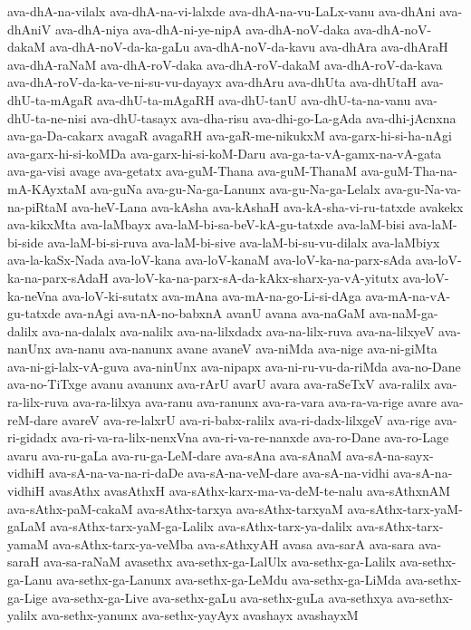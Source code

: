 {ava-dhA-na-vilalx
ava-dhA-na-vi-lalxde
ava-dhA-na-vu-LaLx-vanu
ava-dhAni
ava-dhAniV
ava-dhA-niya
ava-dhA-ni-ye-nipA
ava-dhA-noV-daka
ava-dhA-noV-dakaM
ava-dhA-noV-da-ka-gaLu
ava-dhA-noV-da-kavu
ava-dhAra
ava-dhAraH
ava-dhA-raNaM
ava-dhA-roV-daka
ava-dhA-roV-dakaM
ava-dhA-roV-da-kava
ava-dhA-roV-da-ka-ve-ni-su-vu-dayayx
ava-dhAru
ava-dhUta
ava-dhUtaH
ava-dhU-ta-mAgaR
ava-dhU-ta-mAgaRH
ava-dhU-tanU
ava-dhU-ta-na-vanu
ava-dhU-ta-ne-nisi
ava-dhU-tasayx
ava-dha-risu
ava-dhi-go-La-gAda
ava-dhi-jAcnxna
ava-ga-Da-cakarx
avagaR
avagaRH
ava-gaR-me-nikukxM
ava-garx-hi-si-ha-nAgi
ava-garx-hi-si-koMDa
ava-garx-hi-si-koM-Daru
ava-ga-ta-vA-gamx-na-vA-gata
ava-ga-visi
avage
ava-getatx
ava-guM-Thana
ava-guM-ThanaM
ava-guM-Tha-na-mA-KAyxtaM
ava-guNa
ava-gu-Na-ga-Lanunx
ava-gu-Na-ga-Lelalx
ava-gu-Na-va-na-piRtaM
ava-heV-Lana
ava-kAsha
ava-kAshaH
ava-kA-sha-vi-ru-tatxde
avakekx
ava-kikxMta
ava-laMbayx
ava-laM-bi-sa-beV-kA-gu-tatxde
ava-laM-bisi
ava-laM-bi-side
ava-laM-bi-si-ruva
ava-laM-bi-sive
ava-laM-bi-su-vu-dilalx
ava-laMbiyx
ava-la-kaSx-Nada
ava-loV-kana
ava-loV-kanaM
ava-loV-ka-na-parx-sAda
ava-loV-ka-na-parx-sAdaH
ava-loV-ka-na-parx-sA-da-kAkx-sharx-ya-vA-yitutx
ava-loV-ka-neVna
ava-loV-ki-sutatx
ava-mAna
ava-mA-na-go-Li-si-dAga
ava-mA-na-vA-gu-tatxde
ava-nAgi
ava-nA-no-babxnA
avanU
avana
ava-naGaM
ava-naM-ga-dalilx
ava-na-dalalx
ava-nalilx
ava-na-lilxdadx
ava-na-lilx-ruva
ava-na-lilxyeV
ava-nanUnx
ava-nanu
ava-nanunx
avane
avaneV
ava-niMda
ava-nige
ava-ni-giMta
ava-ni-gi-lalx-vA-guva
ava-ninUnx
ava-nipapx
ava-ni-ru-vu-da-riMda
ava-no-Dane
ava-no-TiTxge
avanu
avanunx
ava-rArU
avarU
avara
ava-raSeTxV
ava-ralilx
ava-ra-lilx-ruva
ava-ra-lilxya
ava-ranu
ava-ranunx
ava-ra-vara
ava-ra-va-rige
avare
ava-reM-dare
avareV
ava-re-lalxrU
ava-ri-babx-ralilx
ava-ri-dadx-lilxgeV
ava-rige
ava-ri-gidadx
ava-ri-va-ra-lilx-nenxVna
ava-ri-va-re-nanxde
ava-ro-Dane
ava-ro-Lage
avaru
ava-ru-gaLa
ava-ru-ga-LeM-dare
ava-sAna
ava-sAnaM
ava-sA-na-sayx-vidhiH
ava-sA-na-va-na-ri-daDe
ava-sA-na-veM-dare
ava-sA-na-vidhi
ava-sA-na-vidhiH
avasAthx
avasAthxH
ava-sAthx-karx-ma-va-deM-te-nalu
ava-sAthxnAM
ava-sAthx-paM-cakaM
ava-sAthx-tarxya
ava-sAthx-tarxyaM
ava-sAthx-tarx-yaM-gaLaM
ava-sAthx-tarx-yaM-ga-Lalilx
ava-sAthx-tarx-ya-dalilx
ava-sAthx-tarx-yamaM
ava-sAthx-tarx-ya-veMba
ava-sAthxyAH
avasa
ava-sarA
ava-sara
ava-saraH
ava-sa-raNaM
avasethx
ava-sethx-ga-LalUlx
ava-sethx-ga-Lalilx
ava-sethx-ga-Lanu
ava-sethx-ga-Lanunx
ava-sethx-ga-LeMdu
ava-sethx-ga-LiMda
ava-sethx-ga-Lige
ava-sethx-ga-Live
ava-sethx-gaLu
ava-sethx-guLa
ava-sethxya
ava-sethx-yalilx
ava-sethx-yanunx
ava-sethx-yayAyx
avashayx
avashayxM
}
